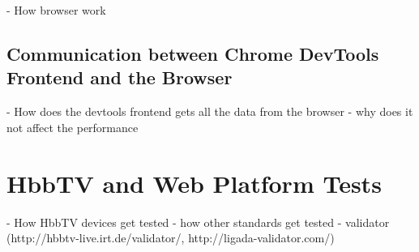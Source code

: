 - How browser work

\subsection{Communication between Chrome DevTools Frontend and the Browser}

- How does the devtools frontend gets all the data from the browser
- why does it not affect the performance

\section{HbbTV and Web Platform Tests}

- How HbbTV devices get tested
- how other standards get tested
- validator (http://hbbtv-live.irt.de/validator/, http://ligada-validator.com/)
